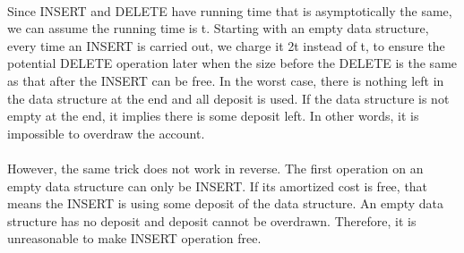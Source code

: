 \begin{problem}{4} ~\\
Since INSERT and DELETE have running time that is asymptotically the same, we can assume the running time is t. Starting with an empty data structure, every time an INSERT is carried out, we charge it 2t instead of t, to ensure the potential DELETE operation later when the size before the DELETE is the same as that after the INSERT can be free. In the worst case, there is nothing left in the data structure at the end and all deposit is used. If the data structure is not empty at the end, it implies there is some deposit left. In other words, it is impossible to overdraw the account.\\
\\
However, the same trick does not work in reverse. The first operation on an empty data structure can only be INSERT. If its amortized cost is free, that means the INSERT is using some deposit of the data structure. An empty data structure has no deposit and deposit cannot be overdrawn. Therefore, it is unreasonable to make INSERT operation free.
\end{problem}